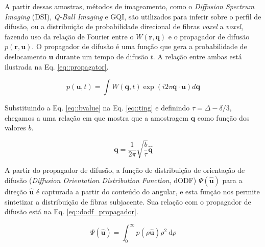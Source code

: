 \documentclass[
    12pt,                %
    oneside,            %
    a4paper,            %
    english,            %
    french,                %
    spanish,            %
    brazil                %
    ]{abntex2}
\begin{document}
A partir dessas amostras, métodos de imageamento, como o \textit{Diffusion Spectrum Imaging} (DSI), \textit{Q-Ball Imaging} e GQI, são utilizados para inferir sobre o perfil de difusão, ou  a distribuição de probabilidade direcional de fibras \textit{voxel} a \textit{voxel}, fazendo uso da relação de Fourier entre o $W(\mathbf{r}, \mathbf{q})$ e o propagador de difusão $p(\mathbf{r}, \mathbf{u})$. O propagador de difusão é uma função que gera a probabilidade de deslocamento $\mathbf{u}$ durante um tempo de difusão $t$. A relação entre ambas está ilustrada na Eq. \ref{eq::propagator}.


\begin{equation}
\label{eq::propagator}
    p( \mathbf{u}, t) =\int W(\mathbf{q}, t) \exp (i2 \pi \mathbf{q} \cdot \mathbf{u}) d \mathbf{q}
\end{equation}


Substituindo a Eq. \ref{eq::bvalue} na Eq. \ref{eq::ting} e definindo $\tau = \Delta - \delta/3$, chegamos a uma relação em que mostra que a amostragem $\mathbf{q}$ como função dos valores $b$.

\begin{equation}
\label{eq::qspace_bvalue}
\mathbf{q} = \frac{1}{2\pi}\sqrt{\frac{b}{\tau}} \mathbf{\hat{q}}
\end{equation}

A partir do propagador de difusão, a função de distribuição de orientação de difusão (\textit{Diffusion Orientation Distribution Function}, dODF) $\Psi(\mathbf{\hat{u}})$ para a direção $\mathbf{\hat{u}}$ é capturada a partir do conteúdo do angular, e esta função nos permite sintetizar a distribuição de fibras subjacente. Sua relação com o propagador de difusão está na Eq. \ref{eq::dodf_propagador}.

\begin{equation}
\label{eq::dodf_propagador}
\Psi(\mathbf{\hat{u}})=\int_{0}^{\infty} p(\rho  \mathbf{\hat{u}}) \rho^2 \mathrm{~d}\rho
\end{equation}
\end{document}
